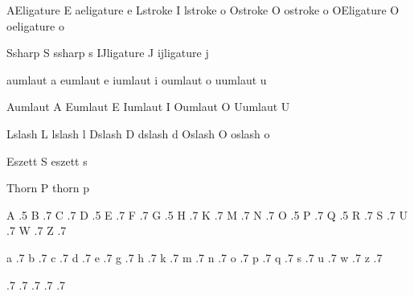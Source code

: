   \inherithandling AEligature E
  \inherithandling aeligature e
  \inherithandling Lstroke    I
  \inherithandling lstroke    o
  \inherithandling Ostroke    O
  \inherithandling ostroke    o
  \inherithandling OEligature O
  \inherithandling oeligature o

  \inherithandling Ssharp     S
  \inherithandling ssharp     s
  \inherithandling IJligature J
  \inherithandling ijligature j

  \inherithandling aumlaut a
  \inherithandling eumlaut e
  \inherithandling iumlaut i
  \inherithandling oumlaut o
  \inherithandling uumlaut u

  \inherithandling Aumlaut A
  \inherithandling Eumlaut E
  \inherithandling Iumlaut I
  \inherithandling Oumlaut O
  \inherithandling Uumlaut U

  \inherithandling Lslash L
  \inherithandling lslash l
  \inherithandling Dslash D
  \inherithandling dslash d
  \inherithandling Oslash O
  \inherithandling oslash o

  \inherithandling Eszett S
  \inherithandling eszett s

  \inherithandling Thorn P
  \inherithandling thorn p

\stopfonthandling

\startfonthandling [hz]

     A .5
     B .7
     C .7
     D .5
     E .7
     F .7
     G .5
     H .7
     K .7
     M .7
     N .7
     O .5
     P .7
     Q .5
     R .7
     S .7
     U .7
     W .7
     Z .7

     a .7
     b .7
     c .7
     d .7
     e .7
     g .7
     h .7
     k .7
     m .7
     n .7
     o .7
     p .7
     q .7
     s .7
     u .7
     w .7
     z .7

     .7
     .7
     .7
     .7
     .7

